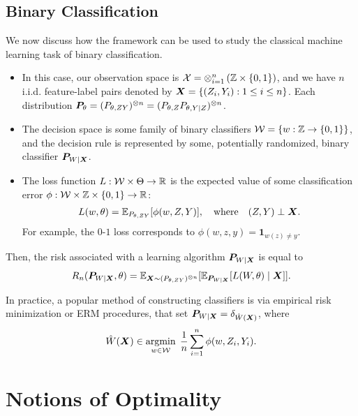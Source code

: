 \documentclass[12pt]{article}
\begin{document}
\subsection{Binary Classification}
We now discuss how the framework can be used to study the classical machine learning task of binary classification. 
\begin{itemize}
	\item In this case, our observation space is $\calX = \otimes_{i=1}^n \lp \bbZ \times \{0, 1\}\rp$, and we have $n$ i.i.d. feature-label pairs denoted by $\X = \{(Z_i, Y_i): 1 \leq i \leq n\}$.  Each distribution $\P_\theta = (P_{\theta, ZY})^{\otimes n} = (P_{\theta, Z} P_{\theta, Y|Z})^{\otimes n}$. 
	
	\item The decision space is some family of binary classifiers $\calW = \{w:\bbZ \to \{0,1\}\}$, and the decision rule is represented by some, potentially randomized, binary classifier $\P_{W|\X}$. 

	\item The loss function $L:\calW \times \Theta \to \mathbb{R}$ is the expected value of some classification error $\phi: \calW \times \bbZ \times \{0, 1\} \to \mathbb{R}$:
	\begin{align}
		L(w, \theta) = \mathbb{E}_{P_{\theta, ZY}}[\phi(w, Z, Y)], \qtext{where} (Z,Y) \perp \X.  
	\end{align}
	For example, the $0$-$1$ loss corresponds to $\phi(w, z, y) = \boldsymbol{1}_{w(z)  \neq y}$. 

\end{itemize}
	Then, the risk associated with a learning algorithm $\P_{W|\X}$ is equal to 
	\begin{align}
	R_n(\P_{W|\X}, \theta) = \mathbb{E}_{\X \sim (P_{\theta, ZY})^{\otimes n} }[ \mathbb{E}_{\P_{W|\X}}[ L(W, \theta) \mid \X] ].  
	\end{align}

	In practice, a popular method of constructing classifiers is via empirical risk minimization or ERM procedures, that set  $\P_{W|\X} = \delta_{\hat{W}(\X)}$, where 
	\begin{align}
	\hat{W}(\X) \in \argmin_{w \in \calW} \; \frac{1}{n} \sum_{i=1}^n \phi(w, Z_i, Y_i). 
	\end{align}

\section{Notions of Optimality}
\end{document}
